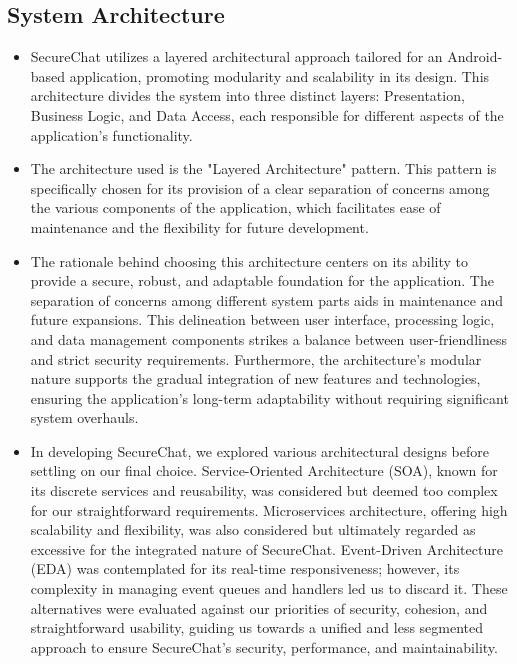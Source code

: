 \documentclass[]{article}
\begin{document}
\subsection{System Architecture}
\label{sub:system_architecture}
\begin{itemize}
	\item SecureChat utilizes a layered architectural approach tailored for an Android-based application, promoting modularity and scalability in its design. This architecture divides the system into three distinct layers: Presentation, Business Logic, and Data Access, each responsible for different aspects of the application's functionality.
	
	\item The architecture used is the "Layered Architecture" pattern. This pattern is specifically chosen for its provision of a clear separation of concerns among the various components of the application, which facilitates ease of maintenance and the flexibility for future development.

	\item The rationale behind choosing this architecture centers on its ability to provide a secure, robust, and adaptable foundation for the application. The separation of concerns among different system parts aids in maintenance and future expansions. This delineation between user interface, processing logic, and data management components strikes a balance between user-friendliness and strict security requirements. Furthermore, the architecture's modular nature supports the gradual integration of new features and technologies, ensuring the application's long-term adaptability without requiring significant system overhauls.

	\item In developing SecureChat, we explored various architectural designs before settling on our final choice. Service-Oriented Architecture (SOA), known for its discrete services and reusability, was considered but deemed too complex for our straightforward requirements. Microservices architecture, offering high scalability and flexibility, was also considered but ultimately regarded as excessive for the integrated nature of SecureChat. Event-Driven Architecture (EDA) was contemplated for its real-time responsiveness; however, its complexity in managing event queues and handlers led us to discard it. These alternatives were evaluated against our priorities of security, cohesion, and straightforward usability, guiding us towards a unified and less segmented approach to ensure SecureChat's security, performance, and maintainability.
\end{itemize}
\end{document}

